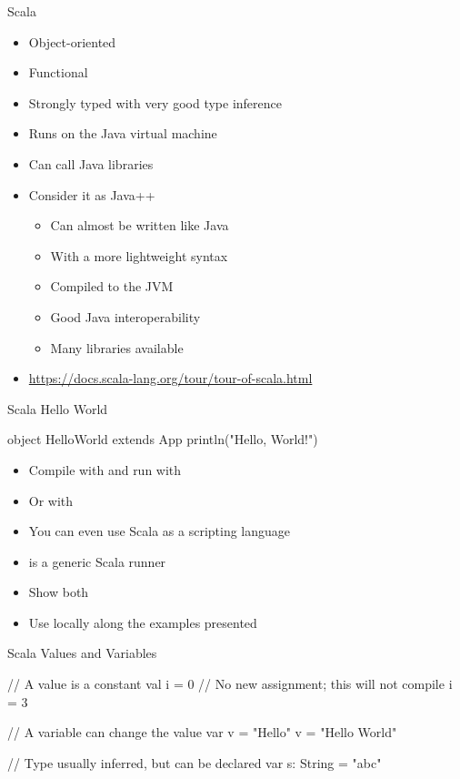 \begin{frame}[fragile]{Scala}
\begin{itemize}
\item Object-oriented
\item Functional
\item Strongly typed with very good type inference
\item Runs on the Java virtual machine
\item Can call Java libraries
\item Consider it as Java++
\begin{itemize}
\item Can almost be written like Java
\item With a more lightweight syntax
\item Compiled to the JVM
\item Good Java interoperability
\item Many libraries available
\end{itemize}
\item \url{https://docs.scala-lang.org/tour/tour-of-scala.html}
\end{itemize}
\end{frame}

\begin{frame}[fragile]{Scala Hello World}
\begin{chisel}
object HelloWorld extends App {
  println("Hello, World!")
}
\end{chisel}
\begin{itemize}
\item Compile with  and run with 
\item Or with 
\item You can even use Scala as a scripting language
\item {} is a generic Scala runner
\item Show both
\item Use  locally along the examples presented
\end{itemize}
\end{frame}



\begin{frame}[fragile]{Scala Values and Variables}
\begin{chisel}
// A value is a constant
val i = 0
// No new assignment; this will not compile
i = 3

// A variable can change the value
var v = "Hello"
v = "Hello World"

// Type usually inferred, but can be declared
var s: String = "abc"
\end{chisel}
\end{frame}

